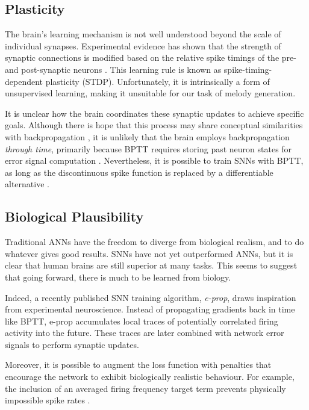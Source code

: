 \documentclass[../../report.tex]{subfiles}
\begin{document}
\subsection{Plasticity}

The brain's learning mechanism is not well understood beyond the scale of
individual synapses. Experimental evidence has shown that the strength of
synaptic connections is modified based on the relative spike timings of the pre-
and post-synaptic neurons \cite{Bliss1973}. This learning rule is known as
spike-timing-dependent plasticity (STDP). Unfortunately, it is intrinsically a
form of unsupervised learning, making it unsuitable for our task of melody
generation.

It is unclear how the brain coordinates these synaptic updates to achieve
specific goals. Although there is hope that this process may share conceptual
similarities with backpropagation \cite{Lillicrap2020}, it is unlikely that the
brain employs backpropagation \emph{through time}, primarily because BPTT
requires storing past neuron states for error signal computation
\cite{Lillicrap2019}. Nevertheless, it is possible to train SNNs with BPTT, as
long as the discontinuous spike function is replaced by a differentiable
alternative \cite{Bellec2018LSNN}.

\subsection{Biological Plausibility}

Traditional ANNs have the freedom to diverge from biological realism, and to do
whatever gives good results. SNNs have not yet outperformed ANNs, but it is
clear that human brains are still superior at many tasks. This seems to suggest
that going forward, there is much to be learned from biology.

Indeed, a recently published SNN training algorithm, \emph{e-prop}, draws
inspiration from experimental neuroscience. Instead of propagating gradients
back in time like BPTT, e-prop accumulates local traces of potentially
correlated firing activity into the future. These traces are later combined with
network error signals\footnotemark{} to perform synaptic updates.
\cite{Bellec2020}


Moreover, it is possible to augment the loss function with penalties that
encourage the network to exhibit biologically realistic behaviour. For example,
the inclusion of an averaged firing frequency target term prevents physically
impossible spike rates \cite{Bellec2018LSNN}.
\end{document}
